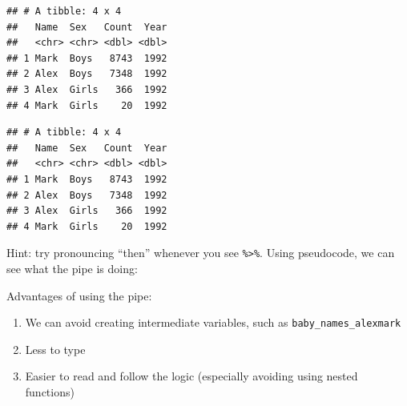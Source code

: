 \documentclass[]{book}
\newenvironment{Shaded}{\begin{snugshade}}{\end{snugshade}}
\newcommand{\CommentTok}[1]{\textcolor[rgb]{0.56,0.35,0.01}{\textit{#1}}}
\newcommand{\DecValTok}[1]{\textcolor[rgb]{0.00,0.00,0.81}{#1}}
\newcommand{\KeywordTok}[1]{\textcolor[rgb]{0.13,0.29,0.53}{\textbf{#1}}}
\newcommand{\NormalTok}[1]{#1}
\newcommand{\OperatorTok}[1]{\textcolor[rgb]{0.81,0.36,0.00}{\textbf{#1}}}
\newcommand{\StringTok}[1]{\textcolor[rgb]{0.31,0.60,0.02}{#1}}
\providecommand{\tightlist}{%
  \setlength{\itemsep}{0pt}\setlength{\parskip}{0pt}}
\begin{document}
\begin{verbatim}
## # A tibble: 4 x 4
##   Name  Sex   Count  Year
##   <chr> <chr> <dbl> <dbl>
## 1 Mark  Boys   8743  1992
## 2 Alex  Boys   7348  1992
## 3 Alex  Girls   366  1992
## 4 Mark  Girls    20  1992
\end{verbatim}

\begin{Shaded}
\end{Shaded}

\begin{verbatim}
## # A tibble: 4 x 4
##   Name  Sex   Count  Year
##   <chr> <chr> <dbl> <dbl>
## 1 Mark  Boys   8743  1992
## 2 Alex  Boys   7348  1992
## 3 Alex  Girls   366  1992
## 4 Mark  Girls    20  1992
\end{verbatim}

Hint: try pronouncing ``then'' whenever you see \texttt{\%\textgreater{}\%}. Using pseudocode,
we can see what the pipe is doing:

\begin{Shaded}
\end{Shaded}

Advantages of using the pipe:

\begin{enumerate}
\def\labelenumi{\arabic{enumi}.}
\tightlist
\item
  We can avoid creating intermediate variables, such as \texttt{baby\_names\_alexmark}
\item
  Less to type
\item
  Easier to read and follow the logic (especially avoiding using nested functions)
\end{enumerate}
\end{document}
